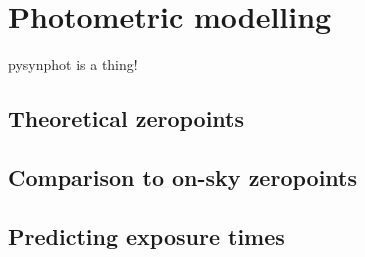 \section{Photometric modelling}
\label{sec:synphot}
\begin{colsection}


\begin{colsection}

pysynphot is a thing!

\end{colsection}

\newpage
\subsection{Theoretical zeropoints}
\label{sec:zeropoints}
\begin{colsection}


\end{colsection}

\newpage
\subsection{Comparison to on-sky zeropoints}
\label{sec:onsky_zeropoints}
\begin{colsection}


\end{colsection}


\newpage
\subsection{Predicting exposure times}
\label{sec:etc}
\begin{colsection}


\end{colsection}


\end{colsection}

